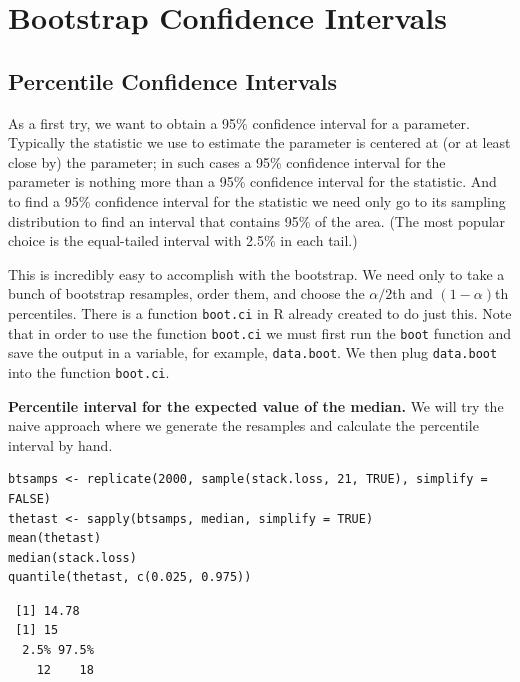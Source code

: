 \documentclass[captions=tableheading]{scrbook}
\begin{document}
\section{Bootstrap Confidence Intervals}
\label{sec-13-3}

\label{sec:Bootstrap-Confidence-Intervals}
\subsection{Percentile Confidence Intervals}
\label{sec-13-3-1}


As a first try, we want to obtain a 95\% confidence interval for a parameter. Typically the statistic we use to estimate the parameter is centered at (or at least close by) the parameter; in such cases a 95\% confidence interval for the parameter is nothing more than a 95\% confidence interval for the statistic. And to find a 95\% confidence interval for the statistic we need only go to its sampling distribution to find an interval that contains 95\% of the area. (The most popular choice is the equal-tailed interval with 2.5\% in each tail.)

This is incredibly easy to accomplish with the bootstrap. We need only to take a bunch of bootstrap resamples, order them, and choose the \(\alpha/2\)th and \((1-\alpha)\)th percentiles. There is a function \texttt{boot.ci} in \textsf{R} already created to do just this. Note that in order  to use the function \texttt{boot.ci} we must first run the \texttt{boot} function and save the output in a variable, for example, \texttt{data.boot}. We then plug \texttt{data.boot} into the function \texttt{boot.ci}.


\begin{example}
\label{exa:percentile-interval-median-first}

\textbf{Percentile interval for the expected value of the median.} We will try the naive approach where we generate the resamples and calculate the percentile interval by hand.


\begin{verbatim}
btsamps <- replicate(2000, sample(stack.loss, 21, TRUE), simplify = FALSE)
thetast <- sapply(btsamps, median, simplify = TRUE)
mean(thetast)
median(stack.loss)
quantile(thetast, c(0.025, 0.975))
\end{verbatim}

\begin{verbatim}
 [1] 14.78
 [1] 15
  2.5% 97.5% 
    12    18
\end{verbatim}

\end{example}
\end{document}

